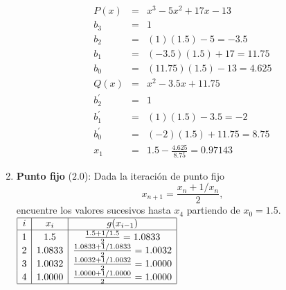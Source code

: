 \documentclass[12pt]{article}
\begin{document}
\begin{enumerate}[leftmargin=*,widest=9]
\begin{eqnarray*}
P(x) & = & x^3 - 5x^2 + 17x -13\\
b_3 & = & 1 \\
b_2 & = & (1)(1.5) - 5 = -3.5\\
b_1 & = & (-3.5)(1.5) + 17 = 11.75\\
b_0 & = & (11.75)(1.5) - 13 = 4.625 \\
Q(x) & = & x^2 - 3.5x + 11.75 \\
b^\prime_2 & = & 1 \\
b^\prime_1 & = & (1)(1.5) - 3.5 = -2\\
b^\prime_0 & = & (-2)(1.5) + 11.75 = 8.75\\
x_1 & = & 1.5 - \frac{4.625}{8.75} = 0.97143
\end{eqnarray*}
    \item \textbf{Punto fijo} ($2.0$): Dada la iteración de punto fijo \[ x_{n+1} = \frac{x_n + 1/x_n}{2},\] encuentre los valores sucesivos hasta \(x_4\) partiendo de \(x_0=1.5\).
 \centering   \( \begin{array}{|c|c|c|}
    \hline
    i & x_i & g(x_{i-1})\\
    \hline
    1 & 1.5 & \frac{1.5 + 1/1.5}{2} = 1.0833\\
    2 & 1.0833 & \frac{1.0833 + 1/1.0833}{2} = 1.0032\\
    3 & 1.0032 & \frac{1.0032 + 1/1.0032}{2} = 1.0000\\
    4 & 1.0000 & \frac{1.0000 + 1/1.0000}{2} = 1.0000\\
    \hline
    \end{array} \)
  \end{enumerate}
\end{document}
